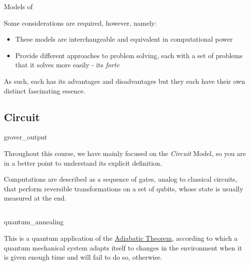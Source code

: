 \documentclass[aspectratio=43]{beamer}
\begin{document}
\begin{frame}{Models of \qcp}
    \begin{card}
        Some considerations are required, however, namely:
        \begin{itemize}
            \item These models are interchangeable and equivalent in computational power
            \item Provide different approaches to problem solving, each with a set of problems that it solves more easily - its \textit{forte}
        \end{itemize}
        As such, each has its advantages and disadvantages but they each have their own distinct fascinating essence.
    \end{card}
\pagenumber
\end{frame}



\subsection{\q Circuit}
\begin{frameImg}[height]{grover_output}
    \begin{card}[\q Circuit]
        Throughout this course, we have mainly focused on the \textit{\q Circuit} Model, so you are in a better point to understand its explicit definition.
    \end{card}
    \begin{card}
        Computations are described as a sequence of gates, analog to classical circuits, that perform reversible transformations on a set of qubits, whose state is usually measured at the end.
    \end{card}
\pagenumber
\end{frameImg}


\subsection{\aqc}
\begin{frameImg}[height]{quantum_annealing}
    \begin{card}[\aqc]
        This is a quantum application of the \href{https://en.wikipedia.org/wiki/Adiabatic_theorem}{Adiabatic Theorem}, according to which a quantum mechanical system adapts itself to changes in the environment when it is given enough time and will fail to do so, otherwise.
    \end{card}
\pagenumber
\end{frameImg}
\end{document}
